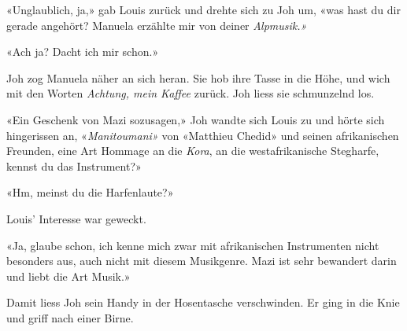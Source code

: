 «Unglaublich, ja,» gab Louis zurück und drehte sich zu Joh um, «was hast
du dir gerade angehört? Manuela erzählte mir von deiner
\emph{Alpmusik.»}

«Ach ja? Dacht ich mir schon.»

Joh zog Manuela näher an sich heran. Sie hob ihre Tasse in die Höhe, und wich mit den Worten \emph{Achtung, mein Kaffee} zurück. Joh liess sie schmunzelnd los.

«Ein Geschenk von Mazi sozusagen,» Joh wandte sich Louis zu und hörte
sich hingerissen an, «\emph{Manitoumani»} von «Matthieu Chedid»
und seinen afrikanischen Freunden, eine Art Hommage an die
\emph{Kora}, an die westafrikanische Stegharfe, kennst du das
Instrument?»
  
«Hm, meinst du die Harfenlaute?»

Louis’ Interesse war geweckt.

«Ja, glaube schon, ich kenne mich zwar mit afrikanischen Instrumenten nicht
besonders aus, auch nicht mit diesem Musikgenre. Mazi ist sehr bewandert
darin und liebt die Art Musik.»

Damit liess Joh sein Handy in der Hosentasche verschwinden. Er ging in
die Knie und griff nach einer Birne.
